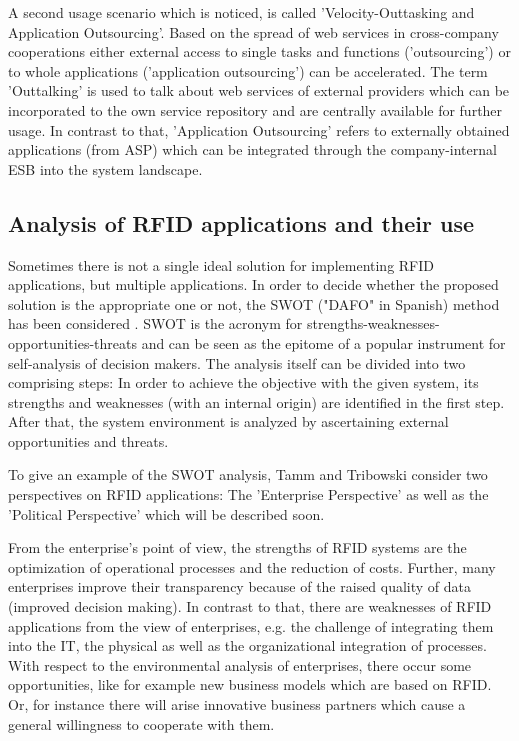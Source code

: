 A second usage scenario which is noticed, is called 'Velocity-Outtasking and Application Outsourcing'. Based on the spread of web services in cross-company cooperations either external access to single tasks and functions ('outsourcing') or to whole applications ('application outsourcing') can be accelerated. 
The term 'Outtalking' is used to talk about web services of external providers which can be incorporated to the own service repository and are centrally available for further usage. In contrast to that, 'Application Outsourcing' refers to externally obtained applications (from \ac{ASP}) which can be integrated through the company-internal ESB into the system landscape.

\subsection{Analysis of RFID applications and their use}

Sometimes there is not a single ideal solution for implementing RFID applications, but multiple applications. In order to decide whether the proposed solution is the appropriate one or not, the \ac{SWOT} ("DAFO" in Spanish) method has been considered \cite[p.47 ff.]{fokus}. SWOT is the acronym for strengths-weaknesses-opportunities-threats and can be seen as the epitome of a popular instrument for self-analysis of decision makers. The analysis itself can be divided into two comprising steps: In order to achieve the objective with the given system, its strengths and weaknesses (with an internal origin) are identified in the first step. After that, the system environment is analyzed by ascertaining external opportunities and threats. 

To give an example of the SWOT analysis, Tamm and Tribowski \cite[p.47 ff.]{fokus} consider two perspectives on RFID applications: The 'Enterprise Perspective' as well as the 'Political Perspective' which will be described soon. 

From the enterprise's point of view, the strengths of RFID systems are the optimization of operational processes and the reduction of costs. Further, many enterprises improve their transparency because of the raised quality of data (improved decision making). In contrast to that, there are weaknesses of RFID applications from the view of enterprises, e.g. the challenge of integrating them into the IT, the physical as well as the organizational integration of processes. With respect to the environmental analysis of enterprises, there occur some opportunities, like for example new business models which are based on RFID. Or, for instance there will arise innovative business partners which cause a general willingness to cooperate with them. 

